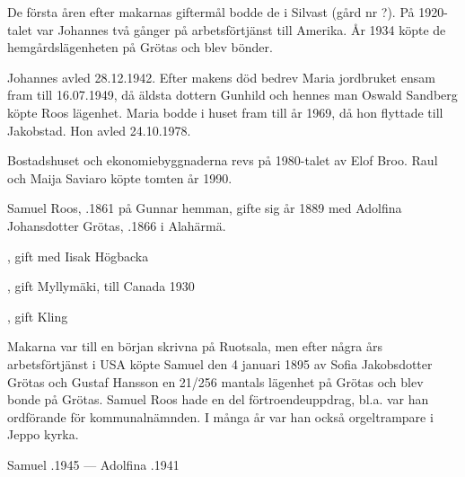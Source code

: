 De första åren efter makarnas giftermål bodde de i Silvast (gård nr ?). På 1920-talet var Johannes två gånger på arbetsförtjänst till Amerika. År 1934 köpte de hemgårdslägenheten på Grötas och blev bönder.

Johannes avled 28.12.1942. Efter makens död bedrev Maria jordbruket ensam fram till 16.07.1949, då äldsta dottern Gunhild och hennes man Oswald Sandberg köpte Roos lägenhet. Maria bodde i huset fram till år 1969, då hon flyttade till Jakobstad. Hon avled 24.10.1978.

Bostadshuset och ekonomiebyggnaderna revs på 1980-talet av Elof Broo. Raul och Maija Saviaro köpte tomten år 1990.


Samuel Roos, .1861 på Gunnar hemman, gifte sig år 1889 med Adolfina Johansdotter Grötas, .1866 i Alahärmä.
\begin{jhchildren}
  \item {}, gift med Iisak Högbacka
  \item {}
  \item {}
  \item {}
  \item {}, gift Myllymäki, till Canada 1930
  \item {}, gift Kling
  \item {}
  \item {}
  \item {}
\end{jhchildren}

Makarna var till en början skrivna på Ruotsala, men efter några års	arbetsförtjänst i USA köpte Samuel den 4 januari 1895 av Sofia Jakobsdotter Grötas och Gustaf Hansson en 21/256 mantals lägenhet	på Grötas och blev bonde på Grötas. Samuel Roos hade en del förtroendeuppdrag, bl.a. var han ordförande för kommunalnämnden. I många år var han också orgeltrampare i Jeppo kyrka.

Samuel .1945  ---  Adolfina .1941


